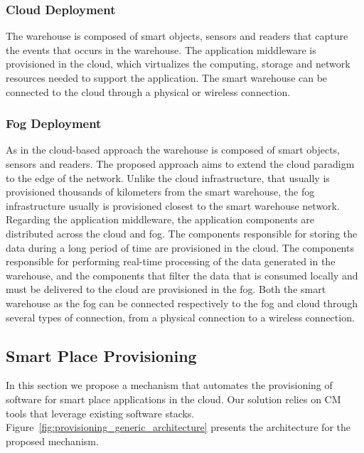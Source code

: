 \subsubsection{Cloud Deployment}
\label{subs:sol_cloud}
The warehouse is composed of smart objects, sensors and readers that capture the events that occurs
in the warehouse. The application middleware is provisioned in the cloud, which virtualizes the computing,
storage and network resources needed to support the application. The smart warehouse can be connected
to the cloud through a physical or wireless connection.\\

\subsubsection{Fog Deployment}
\label{subs:sol_fog}
As in the cloud-based approach the warehouse is composed of smart objects, sensors and readers.
The proposed approach aims to extend the cloud paradigm to the edge of the network. Unlike the
cloud infrastructure, that usually is provisioned thousands of kilometers from the smart warehouse,
the fog infrastructure usually is provisioned closest to the smart warehouse network.\\

Regarding the application middleware, the application components are distributed across the cloud and
fog. The components responsible for storing the data during a long period of time are provisioned in
the cloud. The components responsible for performing real-time processing of the data generated in the
warehouse, and the components that filter the data that is consumed locally and must be delivered to
the cloud are provisioned in the fog. Both the smart warehouse as the fog can be connected respectively
to the fog and cloud through several types of connection, from a physical connection to a wireless
connection.

\subsection{Smart Place Provisioning}
\label{subs:sol_provisioning}
In this section we propose a mechanism that automates the provisioning of software for smart place
applications in the cloud. Our solution relies on \acrfull{CM} tools that leverage existing software
stacks. Figure~\ref{fig:provisioning_generic_architecture} presents the architecture for the proposed
mechanism.\\

